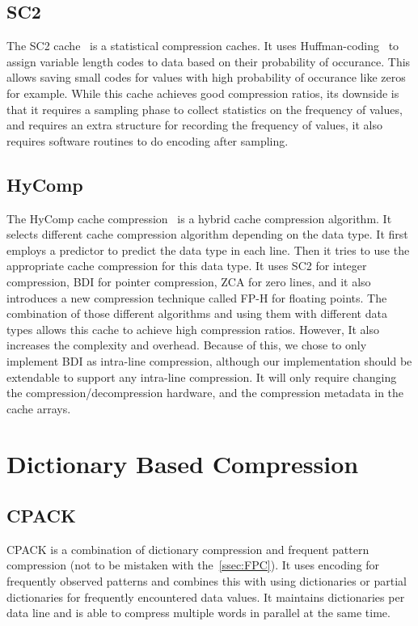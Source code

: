 \subsection{SC2}
The SC2 cache~\cite{sc2} is a statistical compression caches. It uses Huffman-coding~\cite{huffman1952method} to assign variable length codes to data based on their probability of occurance. This allows saving small codes for values with high probability of occurance like zeros for example. While this cache achieves good compression ratios, its downside is that it requires a sampling phase to collect statistics on the frequency of values, and requires an extra structure for recording the frequency of values, it also requires software routines to do encoding after sampling.
\subsection{HyComp}
The HyComp cache compression~\cite{hycomp} is a hybrid cache compression algorithm. It selects different cache compression algorithm depending on the data type. It first employs a predictor to predict the data type in each line. Then it tries to use the appropriate cache compression for this data type. It uses SC2 for integer compression, BDI for pointer compression, ZCA for zero lines, and it also introduces a new compression technique called FP-H for floating points. The combination of those different algorithms and using them with different data types allows this cache to achieve high compression ratios. However, It also increases the complexity and overhead. Because of this, we chose to only implement BDI as intra-line compression, although our implementation should be extendable to support any intra-line compression. It will only require changing the compression/decompression hardware, and the compression metadata in the cache arrays.

\section{Dictionary Based Compression}
\subsection{CPACK}
CPACK is a combination of dictionary compression and frequent pattern compression (not to be mistaken with the~\ref{ssec:FPC}). It uses encoding for frequently observed patterns and combines this with using dictionaries or partial dictionaries for frequently encountered data values. It maintains dictionaries per data line and is able to compress multiple words in parallel at the same time.
